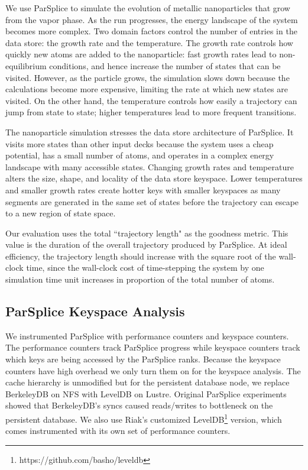 We use ParSplice to simulate the evolution of metallic nanoparticles that grow
from the vapor phase. As the run progresses, the energy landscape of the system
becomes more complex. Two domain factors control the number of entries in the
data store: the growth rate and the temperature. The growth rate controls how
quickly new atoms are added to the nanoparticle: fast growth rates lead to
non-equilibrium conditions, and hence increase the number of states that can be
visited. However, as the particle grows, the simulation slows down because the
calculations become more expensive, limiting the rate at which new states are
visited. On the other hand, the temperature controls how easily a trajectory
can jump from state to state; higher temperatures lead to more frequent
transitions.

The nanoparticle simulation stresses the data store architecture of ParSplice.
It visits more states than other input decks because the system uses a cheap
potential, has a small number of atoms, and operates in a complex energy
landscape with many accessible states. Changing growth rates and temperature
alters the size, shape, and locality of the data store keyspace. Lower
temperatures and smaller growth rates create hotter keys with smaller keyspaces
as many segments are generated in the same set of states before the trajectory
can escape to a new region of state space.

Our evaluation uses the total ``trajectory length" as the goodness metric. This
value is the duration of the overall trajectory produced by ParSplice. At
ideal efficiency, the trajectory length should increase with the square root of
the wall-clock time, since the wall-clock cost of time-stepping the system by
one simulation time unit increases in proportion of the total number of atoms.

\subsection{ParSplice Keyspace Analysis}
\label{sec:parsplice-keyspace-analysis}

We instrumented ParSplice with performance counters and keyspace counters.  The
performance counters track ParSplice progress while keyspace counters track
which keys are being accessed by the ParSplice ranks. Because the keyspace
counters have high overhead we only turn them on for the keyspace analysis.
The cache hierarchy is unmodified but for the persistent database node, we
replace BerkeleyDB on NFS with LevelDB on Lustre. Original ParSplice
experiments showed that BerkeleyDB's syncs caused reads/writes to bottleneck on
the persistent database. We also use Riak's customized
LevelDB\footnote{https://github.com/basho/leveldb} version, which comes
instrumented with its own set of performance counters.

